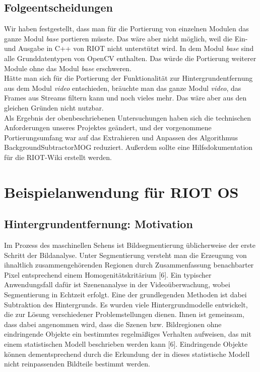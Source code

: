 \documentclass[10pt,a4paper]{article}
\begin{document}
\subsection{Folgeentscheidungen}

Wir haben festgestellt, dass man für die Portierung von einzelnen Modulen das ganze Modul {\it base} portieren müsste. Das wäre aber nicht möglich, weil die Ein- und Ausgabe in C++ von RIOT nicht unterstützt wird. In dem Modul {\it base} sind alle Grunddatentypen von OpenCV enthalten. Das würde die Portierung weiterer Module ohne das Modul {\it base} erschweren. \\

Hätte man sich für die Portierung der Funktionalität zur Hintergrundentfernung aus dem Modul {\it video} entschieden, bräuchte man das ganze Modul {\it video}, das Frames aus Streams filtern kann und noch vieles mehr. Das wäre aber aus den gleichen Gründen nicht nutzbar. \\

Als Ergebnis der obenbeschriebenen Untersuchungen haben sich die technischen Anforderungen unseres Projektes geändert, und der vorgenommene Portierungsumfang war auf das Extrahieren und Anpassen des Algorithmus BackgroundSubtractorMOG reduziert. Außerdem sollte eine Hilfsdokumentation für die RIOT-Wiki erstellt werden.

\newpage
\section{Beispielanwendung für RIOT OS}

\subsection{Hintergrundentfernung: Motivation}

Im Prozess des maschinellen Sehens ist Bildsegmentierung üblicherweise der erste Schritt der Bildanalyse. Unter Segmentierung versteht man die Erzeugung von ihnaltlich zusammengehörenden Regionen durch Zusammenfassung benachbarter Pixel entsprechend einem Homogenitätskritärium [6]. Ein typischer Anwendungsfall dafür ist Szenenanalyse in der Videoüberwachung, wobei Segmentierung in Echtzeit erfolgt. Eine der grundlegenden Methoden ist dabei Subtraktion des Hintergrunds. Es wurden viele Hintergrundmodelle entwickelt, die zur Lösung verschiedener Problemstellungen dienen. Ihnen ist gemeinsam, dass dabei angenommen wird, dass die Szenen bzw. Bildregionen ohne eindringende Objekte ein bestimmtes regelmäßiges Verhalten aufweisen, das mit einem statistischen Modell beschrieben werden kann [6]. Eindringende Objekte können dementsprechend durch die Erkundung der in dieses statistische Modell nicht reinpassenden Bildteile bestimmt werden. \\
\end{document}

